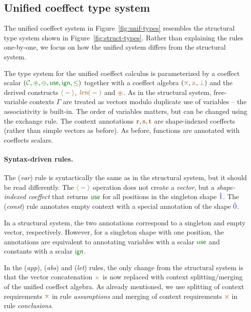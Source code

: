 \subsection{Unified coeffect type system}
\label{sec:further-types}
The unified coeffect system in Figure~\ref{fig:unif-types} resembles the structural type system
shown in Figure~\ref{fig:struct-types}. Rather than explaining the rules one-by-one, we focus on
how the unified system differs from the structural system.

The type system for the unified coeffect calculus is parameterized by a coeffect scalar
$(\C, \cseq, \cpar, \cunit, \czero, \cleq)$ together with a coeffect algebra $(\azip, \apar, \azero)$
and the derived constructs $\alift{-}$, $\alen{-}$ and $\aseq$.
As in the structural system, free-variable contexts $\Gamma$ are treated as vectors modulo duplicate
use of variables -- the associativity is built-in. The order of variables matters, but can be changed
using the exchange rule. The context annotations $\aclrd{\textbf{r}}, \aclrd{\textbf{s}}, \aclrd{\textbf{t}}$
are shape-indexed coeffects (rather than simple vectors as before). As before, functions are
annotated with coeffects scalars.

\paragraph{Syntax-driven rules.}
The (\emph{var}) rule is syntactically the same as in the structural system, but it should be read
differently. The $\alift{-}$ operation does not create a \emph{vector}, but a \emph{shape-indexed
coeffect} that returns $\cunit$ for all positions in the singleton shape $\sunit$.
The (\emph{const}) rule annotates empty context with a special annotation of the shape $\sempty$.

In a structural system, the two annotations correspond to a singleton and empty vector, respectively.
However, for a singleton shape with one position, the annotations are equivalent to annotating
variables with a scalar $\cunit$ and constants with a scalar $\czero$.

In the (\emph{app}), (\emph{abs}) and (\emph{let}) rules, the only change from the structural
system is that the vector concatenation $\atimes$ is now replaced with context splitting/merging
of the unified coeffect algebra. As already mentioned, we use splitting of context requirements $\azip$
in rule \emph{assumptions} and merging of context requirements $\apar$ in rule \emph{conclusions}.

